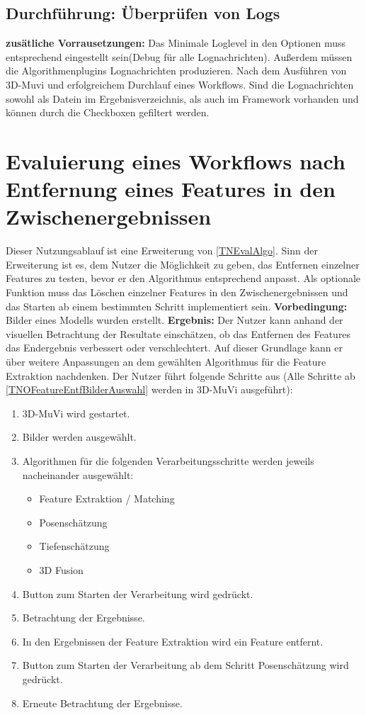 \subsection{Durchführung: Überprüfen von Logs}
\textbf{zusätliche Vorrausetzungen:} Das Minimale Loglevel in den Optionen muss entsprechend eingestellt sein(Debug für alle Lognachrichten). Außerdem müssen die Algorithmenplugins Lognachrichten produzieren.\newline
Nach dem Ausführen von 3D-Muvi und erfolgreichem Durchlauf eines Workflows. Sind die Lognachrichten sowohl als Datein im Ergebnisverzeichnis, als auch im Framework vorhanden und können durch die Checkboxen gefiltert werden.


\section{Evaluierung eines Workflows nach Entfernung eines Features in den Zwischenergebnissen}
Dieser Nutzungsablauf ist eine Erweiterung von \ref{TNEvalAlgo}. Sinn der Erweiterung ist es, dem Nutzer die Möglichkeit zu geben, das Entfernen einzelner Features zu testen, bevor er den Algorithmus entsprechend anpasst. Als optionale Funktion muss das Löschen einzelner Features in den Zwischenergebnissen und das Starten ab einem bestimmten Schritt implementiert sein. \newline
\textbf{Vorbedingung:} Bilder eines Modells wurden erstellt. \newline
\textbf{Ergebnis:} Der Nutzer kann anhand der visuellen Betrachtung der Resultate einschätzen, ob das Entfernen des Features das Endergebnis verbessert oder verschlechtert. Auf dieser Grundlage kann er über weitere Anpassungen an dem gewählten Algorithmus für die Feature Extraktion nachdenken. \newline
Der Nutzer führt folgende Schritte aus (Alle Schritte ab \ref{TNOFeatureEntfBilderAuswahl} werden in 3D-MuVi ausgeführt):
\begin{enumerate}
	\item 3D-MuVi wird gestartet.
	\item \label{TNOFeatureEntfBilderAuswahl} Bilder werden ausgewählt.
	\item Algorithmen für die folgenden Verarbeitungsschritte werden jeweils nacheinander ausgewählt:
	\begin{itemize}
		\item Feature Extraktion / Matching
		\item Posenschätzung
		\item Tiefenschätzung
		\item 3D Fusion
	\end{itemize}
	\item Button zum Starten der Verarbeitung wird gedrückt.
	\item Betrachtung der Ergebnisse.
	\item In den Ergebnissen der Feature Extraktion wird ein Feature entfernt.
	\item Button zum Starten der Verarbeitung ab dem Schritt Posenschätzung wird gedrückt.
	\item Erneute Betrachtung der Ergebnisse.
\end{enumerate}
